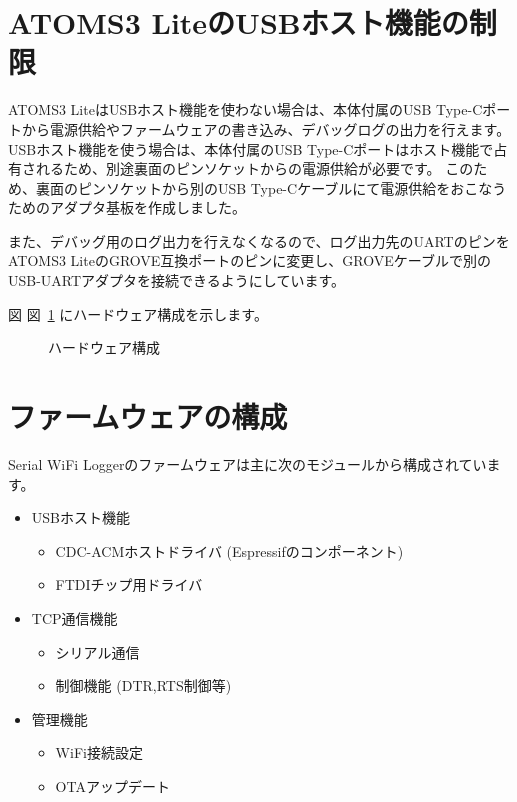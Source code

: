 \documentclass[10pt,twoside,openany,a4j]{ltjsbook}
\newcommand{\pandocbounded}[1]{#1}
\providecommand{\tightlist}{%
  \setlength{\itemsep}{0pt}\setlength{\parskip}{0pt}}
\begin{document}
\section{ATOMS3
LiteのUSBホスト機能の制限}\label{atoms3-liteux306eusbux30dbux30b9ux30c8ux6a5fux80fdux306eux5236ux9650}

ATOMS3 LiteはUSBホスト機能を使わない場合は、本体付属のUSB
Type-Cポートから電源供給やファームウェアの書き込み、デバッグログの出力を行えます。
USBホスト機能を使う場合は、本体付属のUSB
Type-Cポートはホスト機能で占有されるため、別途裏面のピンソケットからの電源供給が必要です。
このため、裏面のピンソケットから別のUSB
Type-Cケーブルにて電源供給をおこなうためのアダプタ基板を作成しました。

また、デバッグ用のログ出力を行えなくなるので、ログ出力先のUARTのピンをATOMS3
LiteのGROVE互換ポートのピンに変更し、GROVEケーブルで別のUSB-UARTアダプタを接続できるようにしています。

図 図~\ref{fig:hardware_diagram} にハードウェア構成を示します。

\begin{figure}
\centering
\pandocbounded{}
\caption{ハードウェア構成}\label{fig:hardware_diagram}
\end{figure}

\section{ファームウェアの構成}\label{ux30d5ux30a1ux30fcux30e0ux30a6ux30a7ux30a2ux306eux69cbux6210}

Serial WiFi
Loggerのファームウェアは主に次のモジュールから構成されています。

\begin{itemize}
\tightlist
\item
  USBホスト機能

  \begin{itemize}
  \tightlist
  \item
    CDC-ACMホストドライバ (Espressifのコンポーネント)
  \item
    FTDIチップ用ドライバ
  \end{itemize}
\item
  TCP通信機能

  \begin{itemize}
  \tightlist
  \item
    シリアル通信
  \item
    制御機能 (DTR,RTS制御等)
  \end{itemize}
\item
  管理機能　

  \begin{itemize}
  \tightlist
  \item
    WiFi接続設定
  \item
    OTAアップデート
  \end{itemize}
\end{itemize}
\end{document}
